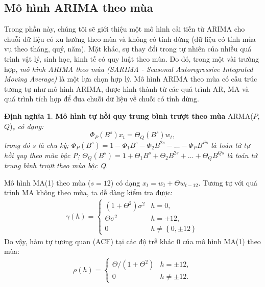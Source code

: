\documentclass[12pt, a4paper,oneside]{book}
\theoremstyle{definition}
\newtheorem{dn}[theo]{Định nghĩa}
\begin{document}
\subsection{Mô hình ARIMA theo mùa}
Trong phần này, chúng tôi sẽ giới thiệu một mô hình cải tiến từ ARIMA cho chuỗi dữ liệu có xu hướng theo mùa và không có tính dừng (dữ liệu có tính mùa vụ theo tháng, quý, năm). Mặt khác, sự thay đổi trong tự nhiên của nhiều quá trình vật lý, sinh học, kinh tế có quy luật theo mùa. Do đó, trong một vài trường hợp, \textit{mô hình ARIMA theo mùa (SARIMA - Seasonal Autoregressive Integrated Moving Average)} là một lựa chọn hợp lý. Mô hình ARIMA theo mùa có cấu trúc tương tự như mô hình ARIMA, được hình thành từ các quá trình AR, MA và quá trình tích hợp để đưa chuỗi dữ liệu về chuỗi có tính dừng. 

\begin{dn}\cite{1} \textbf{Mô hình tự hồi quy trung bình trượt theo mùa} ARMA($P$, $Q$)$_s$ \textit{có dạng: 
		\begin{equation}
		\Phi_{P}(B^{s})x_{t}=\varTheta_{Q}(B^{s})w_{t}, \label{ct1.193}
		\end{equation}
		trong đó $ s $ là chu kỳ; $\Phi_ {P} (B^{s}) = 1- \Phi_{1}  B^{s}- \Phi_{2}  B^{2s}- \dots- \Phi_{P}  B^{Ps} \label{ct1.194} $ là toán tử tự hồi quy theo mùa bậc P; $\varTheta_{Q}(B^{s})= 1+ \varTheta_{1}B^{s} + \varTheta_{2}B^{2s}+ \dots+ \varTheta_{Q}B^{Qs} \label{ct1.195}	 $ là toán tử trung bình trượt theo mùa bậc Q.}
\end{dn}

Mô hình MA(1) theo mùa ($s=12$) có dạng $x_t=w_t+\Theta w_{t-12}$. Tương tự với quá trình MA không theo mùa, ta dễ dàng kiểm tra được:
\begin{align}
\gamma(h)=
\begin{cases} 
(1+\Theta^{2})\sigma^{2}& h=0,\\
\Theta\sigma^{2}& h=\pm12,\\
0 \hspace{1cm}& h\neq\left\lbrace 0, \pm 12\right\rbrace 
\end{cases}
\end{align}
Do vậy, hàm tự tương quan (ACF) tại các độ trễ khác 0 của mô hình MA(1) theo mùa:
\begin{align}
\rho(h)=
\begin{cases} 
\Theta/(1+\Theta^{2})& h=\pm12,\\
0 \hspace{1cm}& h\neq\pm12. 
\end{cases}
\end{align}
\end{document}

